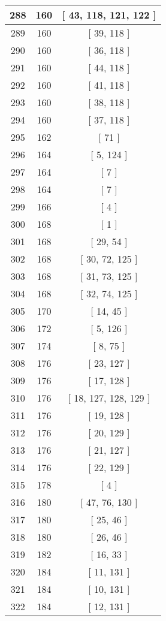 \begin{center}
\begin{longtable}[H]{|| c c c ||}
\hline
288 & 160 & [ 43, 118, 121, 122 ] \\ 
\hline
289 & 160 & [ 39, 118 ] \\ 
\hline
290 & 160 & [ 36, 118 ] \\ 
\hline
291 & 160 & [ 44, 118 ] \\ 
\hline
292 & 160 & [ 41, 118 ] \\ 
\hline
293 & 160 & [ 38, 118 ] \\ 
\hline
294 & 160 & [ 37, 118 ] \\ 
\hline
295 & 162 & [ 71 ] \\ 
\hline
296 & 164 & [ 5, 124 ] \\ 
\hline
297 & 164 & [ 7 ] \\ 
\hline
298 & 164 & [ 7 ] \\ 
\hline
299 & 166 & [ 4 ] \\ 
\hline
300 & 168 & [ 1 ] \\ 
\hline
301 & 168 & [ 29, 54 ] \\ 
\hline
302 & 168 & [ 30, 72, 125 ] \\ 
\hline
303 & 168 & [ 31, 73, 125 ] \\ 
\hline
304 & 168 & [ 32, 74, 125 ] \\ 
\hline
305 & 170 & [ 14, 45 ] \\ 
\hline
306 & 172 & [ 5, 126 ] \\ 
\hline
307 & 174 & [ 8, 75 ] \\ 
\hline
308 & 176 & [ 23, 127 ] \\ 
\hline
309 & 176 & [ 17, 128 ] \\ 
\hline
310 & 176 & [ 18, 127, 128, 129 ] \\ 
\hline
311 & 176 & [ 19, 128 ] \\ 
\hline
312 & 176 & [ 20, 129 ] \\ 
\hline
313 & 176 & [ 21, 127 ] \\ 
\hline
314 & 176 & [ 22, 129 ] \\ 
\hline
315 & 178 & [ 4 ] \\ 
\hline
316 & 180 & [ 47, 76, 130 ] \\ 
\hline
317 & 180 & [ 25, 46 ] \\ 
\hline
318 & 180 & [ 26, 46 ] \\ 
\hline
319 & 182 & [ 16, 33 ] \\ 
\hline
320 & 184 & [ 11, 131 ] \\ 
\hline
321 & 184 & [ 10, 131 ] \\ 
\hline
322 & 184 & [ 12, 131 ] \\ 

\end{longtable}
\end{center}
